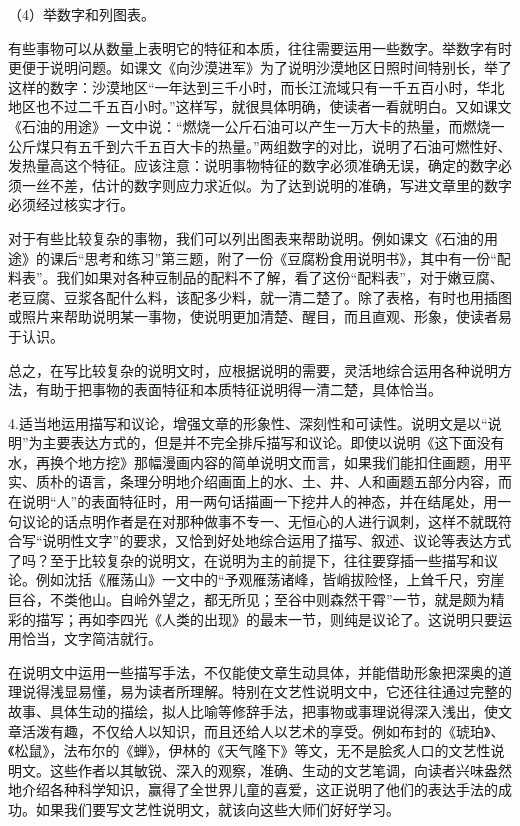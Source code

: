 （4）举数字和列图表。

有些事物可以从数量上表明它的特征和本质，往往需要运用一些数字。举数字有时更便于说明问题。如课文《向沙漠进军》为了说明沙漠地区日照时间特别长，举了这样的数字：沙漠地区“一年达到三千小时，而长江流域只有一千五百小时，华北地区也不过二千五百小时。”这样写，就很具体明确，使读者一看就明白。又如课文《石油的用途》一文中说：“燃烧一公斤石油可以产生一万大卡的热量，而燃烧一公斤煤只有五千到六千五百大卡的热量。”两组数字的对比，说明了石油可燃性好、发热量高这个特征。应该注意：说明事物特征的数字必须准确无误，确定的数字必须一丝不差，估计的数字则应力求近似。为了达到说明的准确，写进文章里的数字必须经过核实才行。

对于有些比较复杂的事物，我们可以列出图表来帮助说明。例如课文《石油的用途》的课后“思考和练习”第三题，附了一份《豆腐粉食用说明书》，其中有一份“配料表”。我们如果对各种豆制品的配料不了解，看了这份“配料表”，对于嫩豆腐、老豆腐、豆浆各配什么料，该配多少料，就一清二楚了。除了表格，有时也用插图或照片来帮助说明某一事物，使说明更加清楚、醒目，而且直观、形象，使读者易于认识。

总之，在写比较复杂的说明文时，应根据说明的需要，灵活地综合运用各种说明方法，有助于把事物的表面特征和本质特征说明得一清二楚，具体恰当。

4.适当地运用描写和议论，增强文章的形象性、深刻性和可读性。说明文是以“说明”为主要表达方式的，但是并不完全排斥描写和议论。即使以说明《这下面没有水，再换个地方挖》那幅漫画内容的简单说明文而言，如果我们能扣住画题，用平实、质朴的语言，条理分明地介绍画面上的水、土、井、人和画题五部分内容，而在说明“人”的表面特征时，用一两句话描画一下挖井人的神态，并在结尾处，用一句议论的话点明作者是在对那种做事不专一、无恒心的人进行讽刺，这样不就既符合写“说明性文字”的要求，又恰到好处地综合运用了描写、叙述、议论等表达方式了吗？至于比较复杂的说明文，在说明为主的前提下，往往要穿插一些描写和议论。例如沈括《雁荡山》一文中的“予观雁荡诸峰，皆峭拔险怪，上耸千尺，穷崖巨谷，不类他山。自岭外望之，都无所见；至谷中则森然干霄”一节，就是颇为精彩的描写；再如李四光《人类的出现》的最末一节，则纯是议论了。这说明只要运用恰当，文字简洁就行。

在说明文中运用一些描写手法，不仅能使文章生动具体，并能借助形象把深奥的道理说得浅显易懂，易为读者所理解。特别在文艺性说明文中，它还往往通过完整的故事、具体生动的描绘，拟人比喻等修辞手法，把事物或事理说得深入浅出，使文章活泼有趣，不仅给人以知识，而且还给人以艺术的享受。例如布封的《琥珀》、《松鼠》，法布尔的《蝉》，伊林的《天气隆下》等文，无不是脍炙人口的文艺性说明文。这些作者以其敏锐、深入的观察，准确、生动的文艺笔调，向读者兴味盎然地介绍各种科学知识，赢得了全世界儿童的喜爱，这正说明了他们的表达手法的成功。如果我们要写文艺性说明文，就该向这些大师们好好学习。

